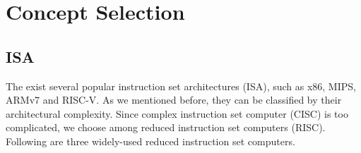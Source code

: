 
\let\clearpage\relax
\chapter{Concept Selection}

\section{ISA}\label{section:isa} %
The exist several popular instruction set architectures (ISA), such as x86, MIPS, ARMv7 and RISC-V. As we mentioned before, they can be classified by their architectural complexity. Since complex instruction set computer (CISC) is too complicated, we choose among reduced instruction set computers (RISC). Following are three widely-used reduced instruction set computers.


